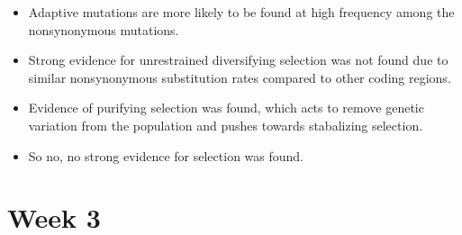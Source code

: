 \documentclass[12pt,a4paper]{article}
\begin{document}
\begin{itemize}
        \begin{itemize}
            \item Adaptive mutations are more likely to be found at high frequency among the nonsynonymous mutations.
            \item Strong evidence for unrestrained diversifying selection was not found due to similar nonsynonymous substitution rates compared to other coding regions.
            \item Evidence of purifying selection was found, which acts to remove genetic variation from the population and pushes towards stabalizing selection.
            \item So no, no strong evidence for selection was found.
        \end{itemize}
\end{itemize}


\clearpage
\section*{Week 3}
{}

\end{document}
